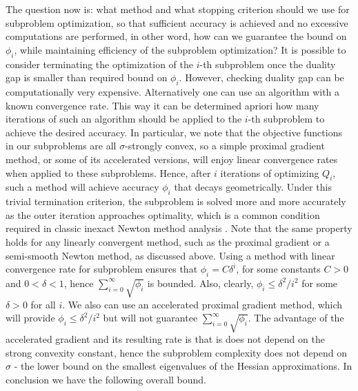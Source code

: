 \documentclass[11pt]{article}
\numberwithin{equation}{section}
\begin{document}
%
The question now is: what method and what stopping criterion should we use for subproblem optimization, so that sufficient accuracy is achieved 
and no excessive computations are performed, in other word, how can we guarantee the bound on $\phi_i$,  
while maintaining efficiency of the subproblem optimization? 
It is possible to consider terminating
 the optimization of the $i$-th subproblem once the duality gap is smaller than required bound on $\phi_i$.  
 However, checking duality gap can be computationally  very expensive. 
 Alternatively one can use an algorithm with a known  convergence rate. 
 This way it can be determined apriori how many iterations of such an algorithm should be applied to the $i$-th subproblem to achieve the desired accuracy. In particular, we note that the objective functions in our subproblems  are all $\sigma$-strongly convex, so a simple proximal gradient method, or some of its accelerated versions,  will enjoy linear convergence rates when applied to these subproblems.  Hence, after $i$ iterations of optimizing
  $Q_i$,  such a method will achieve accuracy $\phi_i$ that decays geometrically.  Under this trivial termination criterion,  the subproblem is solved more and more accurately as the outer iteration approaches optimality, which is a common condition required in classic inexact Newton method analysis \cite{DemboEisenstatSteihaug1982}. 
Note that the same property holds for any linearly convergent  method, such as the proximal gradient or a semi-smooth Newton method, as discussed  above. 
Using a method with linear convergence rate for subproblem ensures that $\phi_i=C\delta^i$, for some constants $C>0$ and $0<\delta<1$, hence 
$\sum_{i=0}^{\infty} \sqrt{\phi_i}$ is  bounded. Also, clearly, $\phi_i\leq \delta^2/i^2$ for some $\delta>0$ for all $i$.   
We also can use an accelerated proximal gradient method, which will provide $\phi_i\leq \delta^2/i^2$ but will not guarantee $\sum_{i=0}^{\infty} \sqrt{\phi_i}$.
The advantage of the accelerated gradient and its resulting rate is that is does not depend on the strong convexity constant, hence the subproblem complexity does not depend on  $\sigma$ - the lower bound on the smallest eigenvalues of the Hessian approximations. In conclusion we have the following overall bound. 
\end{document}
